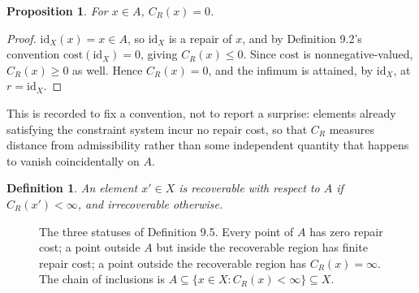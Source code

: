 \documentclass[11pt]{book}
\newtheorem{definition}[theorem]{Definition}
\newtheorem{proposition}[theorem]{Proposition}
\begin{document}
\begin{proposition}
For $x \in A$, $C_R(x) = 0$.
\end{proposition}

\begin{proof}
$\mathrm{id}_X(x) = x \in A$, so $\mathrm{id}_X$ is a repair of $x$, and by Definition 9.2's convention $\mathrm{cost}(\mathrm{id}_X) = 0$, giving $C_R(x) \leq 0$. Since $\mathrm{cost}$ is nonnegative-valued, $C_R(x) \geq 0$ as well. Hence $C_R(x) = 0$, and the infimum is attained, by $\mathrm{id}_X$, at $r = \mathrm{id}_X$.
\end{proof}

This is recorded to fix a convention, not to report a surprise: elements already satisfying the constraint system incur no repair cost, so that $C_R$ measures distance from admissibility rather than some independent quantity that happens to vanish coincidentally on $A$.

\begin{definition}
An element $x' \in X$ is \emph{recoverable} with respect to $A$ if $C_R(x') < \infty$, and \emph{irrecoverable} otherwise.
\end{definition}

\begin{figure}[htb]
\centering
{}
\caption{The three statuses of Definition 9.5. Every point of $A$ has zero repair cost; a point outside $A$ but inside the recoverable region has finite repair cost; a point outside the recoverable region has $C_R(x) = \infty$. The chain of inclusions is $A \subseteq \{x \in X : C_R(x) < \infty\} \subseteq X$.}
\label{fig:repair-status}
\end{figure}
\end{document}
